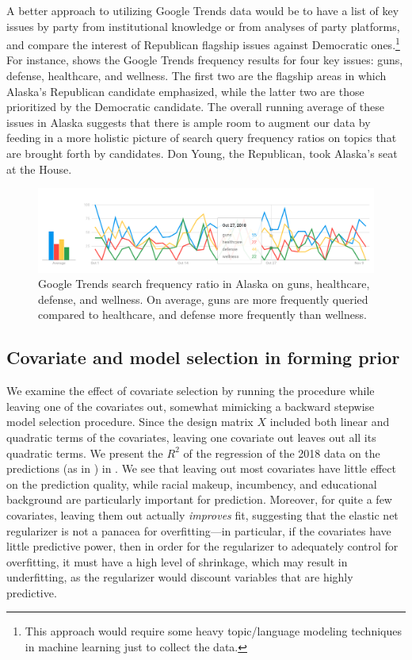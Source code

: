 \documentclass[12pt]{article}
\begin{document}
A better approach to utilizing Google Trends data would be to have a list of key issues by party from institutional knowledge or from analyses of party platforms, and compare the interest of Republican flagship issues against Democratic ones.\footnote{This approach would require some heavy topic/language modeling techniques in machine learning just to collect the data.} For instance,  shows the Google Trends frequency results for four key issues: guns, defense, healthcare, and wellness. The first two are the flagship areas in which Alaska's Republican candidate emphasized, while the latter two are those prioritized by the Democratic candidate. The overall running average of these issues in Alaska suggests that there is ample room to augment our data by feeding in a more holistic picture of search query frequency ratios on topics that are brought forth by candidates. Don Young, the Republican, took Alaska's seat at the House.

\begin{figure}[tbh]
  \centering
  \includegraphics[scale=0.4]{trends_issues}
  \caption{Google Trends search frequency ratio in Alaska on guns, healthcare, defense, and wellness. On average, guns are more frequently queried compared to healthcare, and defense more frequently than wellness.}
  \label{fig:trends_issues}
\end{figure}

\subsection{Covariate and model selection in forming prior}

We examine the effect of covariate selection by running the procedure while leaving one of the covariates out, somewhat mimicking a backward stepwise model selection procedure. Since the design matrix $X$ included both linear and quadratic terms of the covariates, leaving one covariate out leaves out all its quadratic terms. We present the $R^2$ of the regression of the 2018 data on the predictions (as in ) in . We see that leaving out most covariates have little effect on the prediction quality, while racial makeup, incumbency, and educational background are particularly important for prediction. Moreover, for quite a few covariates, leaving them out actually \emph{improves} fit, suggesting that the elastic net regularizer is not a panacea for overfitting---in particular, if the covariates have little predictive power, then in order for the regularizer to adequately control for overfitting, it must have a high level of shrinkage, which may result in underfitting, as the regularizer would discount variables that are highly predictive.
\end{document}
